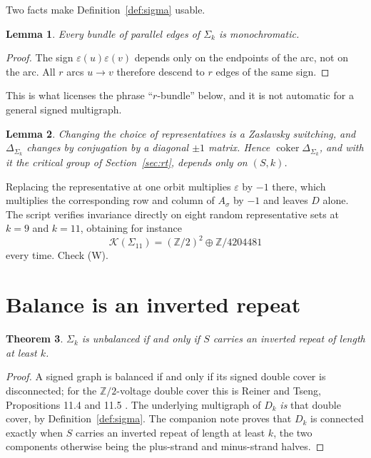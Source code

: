 \documentclass[11pt]{article}
\theoremstyle{plain}
\newtheorem{theorem}{Theorem}
\newtheorem{lemma}[theorem]{Lemma}
\theoremstyle{definition}
\theoremstyle{remark}
\newcommand{\Z}{\mathbb{Z}}
\newcommand{\K}{\mathcal{K}}
\newcommand{\coker}{\operatorname{coker}}
\newcommand{\Sig}{\Sigma}
\begin{document}
Two facts make Definition~\ref{def:sigma} usable.

\begin{lemma}\label{lem:mono}
Every bundle of parallel edges of $\Sig_k$ is monochromatic.
\end{lemma}

\begin{proof}
The sign $\varepsilon(u)\varepsilon(v)$ depends only on the endpoints of the arc, not on the
arc. All $r$ arcs $u\to v$ therefore descend to $r$ edges of the same sign.
\end{proof}

This is what licenses the phrase ``$r$-bundle'' below, and it is not automatic for a general
signed multigraph.

\begin{lemma}\label{lem:switch}
Changing the choice of representatives is a Zaslavsky switching, and
$\Delta_{\Sig_k}$ changes by conjugation by a diagonal $\pm1$ matrix. Hence $\coker
\Delta_{\Sig_k}$, and with it the critical group of Section~\ref{sec:rt}, depends only on
$(S,k)$.
\end{lemma}

Replacing the representative at one orbit multiplies $\varepsilon$ by $-1$ there, which
multiplies the corresponding row and column of $A_\sigma$ by $-1$ and leaves $D$ alone. The
script verifies invariance directly on eight random representative sets at $k=9$ and $k=11$,
obtaining for instance
\[
  \K(\Sig_{11})=(\Z/2)^2\oplus\Z/4204481
\]
every time. Check (W).

\section{Balance is an inverted repeat}

\begin{theorem}\label{thm:balance}
$\Sig_k$ is unbalanced if and only if $S$ carries an inverted repeat of length at least $k$.
\end{theorem}

\begin{proof}
A signed graph is balanced if and only if its signed double cover is disconnected; for the
$\Z/2$-voltage double cover this is Reiner and Tseng, Propositions 11.4 and 11.5
\cite{RT14}. The underlying multigraph of $D_k$ \emph{is} that double cover, by
Definition~\ref{def:sigma}. The companion note proves that $D_k$ is connected exactly when
$S$ carries an inverted repeat of length at least $k$, the two components otherwise being
the plus-strand and minus-strand halves.
\end{proof}
\end{document}
